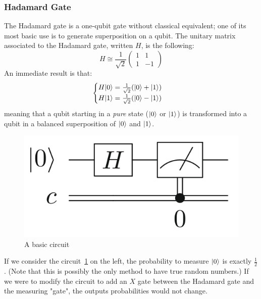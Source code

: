 \documentclass[12pt,a4paper]{article}
\theoremstyle{plain}
\theoremstyle{definition}
\DeclarePairedDelimiter\ket{\lvert}{\rangle}
\begin{document}
\subsubsection{Hadamard Gate}
The Hadamard gate is a one-qubit gate without classical equivalent; one of its most basic use is to generate superposition on a qubit. The unitary matrix associated to the Hadamard gate, written $H$, is the following:
\begin{equation*}
    H \cong \frac{1}{\sqrt{2}}
    \begin{pmatrix}
        1&1\\
        1&-1
    \end{pmatrix}
\end{equation*}
An immediate result is that:
\begin{equation*}
    \begin{cases}
        H\ket{0} = \frac{1}{\sqrt{2}}(\ket{0}+\ket{1}) \\
        H\ket{1} = \frac{1}{\sqrt{2}}(\ket{0}-\ket{1})
    \end{cases}
\end{equation*}
meaning that a qubit starting in a \emph{pure} state ($\ket{0}$ or $\ket{1}$) is transformed into a qubit in a balanced superposition of $\ket{0}$ and $\ket{1}$.

\begin{figure}
    \label{fig:basic-circuit}
    \centering
    \includegraphics*[scale=0.3]{basic-circuit.png}
    \caption{A basic circuit}
\end{figure}

If we consider the circuit \ref{fig:basic-circuit} on the left, the probability to measure $\ket{0}$ is exactly $\frac{1}{2}$. (Note that this is possibly the only method to have true random numbers.) If we were to modify the circuit to add an $X$ gate between the Hadamard gate and the measuring "gate", the outputs probabilities would not change. 
\end{document}
